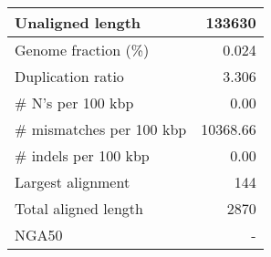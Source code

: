 \documentclass[12pt,a4paper]{article}
\begin{document}
\begin{table}[ht]
\begin{center}
\begin{tabular}{|l*{1}{|r}|}
Unaligned length & 133630 \\ \hline
Genome fraction (\%) & 0.024 \\ \hline
Duplication ratio & 3.306 \\ \hline
\# N's per 100 kbp & 0.00 \\ \hline
\# mismatches per 100 kbp & 10368.66 \\ \hline
\# indels per 100 kbp & 0.00 \\ \hline
Largest alignment & 144 \\ \hline
Total aligned length & 2870 \\ \hline
NGA50 & - \\ \hline
\end{tabular}
\end{center}
\end{table}
\end{document}
